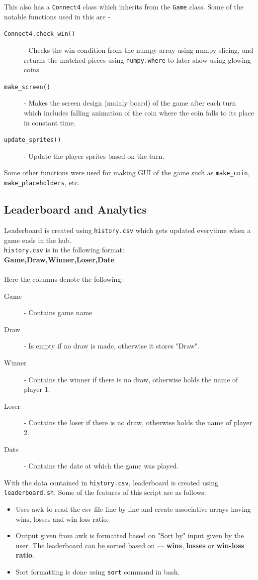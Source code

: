 \documentclass{article}
\begin{document}
This also has a \texttt{Connect4} class which inherits from the \texttt{Game} class. Some of the notable functions used in this are - 
\begin{description}
    \item[\texttt{Connect4.check\_win()}] - Checks the win condition from the numpy array using numpy slicing, and returns the matched pieces using \texttt{numpy.where}\cite{numpyDocs} to later show using glowing coins.
    \item[\texttt{make\_screen()}] - Makes the screen design (mainly board) of the game after each turn which includes falling animation of the coin where the coin falls to its place in constant time.
    \item[\texttt{update\_sprites()}] - Update the player sprites based on the turn.
\end{description}

Some other functions were used for making GUI of the game such as \texttt{make\_coin}, \texttt{make\_placeholders}, etc.

\subsection{Leaderboard and Analytics}
Leaderboard is created using \texttt{history.csv} which gets updated everytime when a game ends in the hub.
\\
\texttt{history.csv} is in the following format:
\\
\textbf{Game,Draw,Winner,Loser,Date}
\\
\\
Here the columns denote the following:
\begin{description}
    \item[Game] - Contains game name
    \item[Draw] - Is empty if no draw is made, otherwise it stores "Draw".
    \item[Winner] - Contains the winner if there is no draw, otherwise holds the name of player 1.
    \item[Loser] - Contains the loser if there is no draw, otherwise holds the name of player 2.
    \item[Date] - Contains the date at which the game was played.
\end{description}

With the data contained in \texttt{history.csv}, leaderboard is created using \texttt{leaderboard.sh}. Some of the features of this script are as follows:
\begin{itemize}
    \item Uses awk \cite{awkDocs} to read the csv file line by line and create associative arrays having wins, losses and win-loss ratio.
    \item Output given from awk is formatted based on "Sort by" input given by the user. The leaderboard can be sorted based on --- \textbf{wins}, \textbf{losses} or \textbf{win-loss ratio}.
    \item Sort formatting is done using \texttt{sort} command in bash.
\end{itemize}
\end{document}
